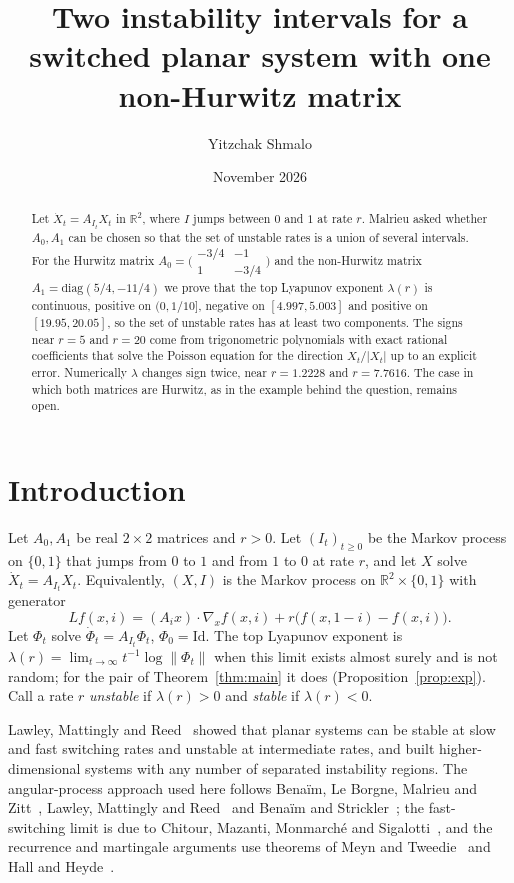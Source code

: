 \documentclass[11pt]{amsart}
\title[Two instability intervals for a switched planar system]{Two instability intervals for a switched planar system with one non-Hurwitz matrix}
\author{Yitzchak Shmalo}
\date{November 2026}
\newcommand{\R}{\mathbb{R}}
\begin{document}
\begin{abstract}
Let $\dot X_t=A_{I_t}X_t$ in $\R^2$, where $I$ jumps between $0$ and $1$ at rate $r$. Malrieu asked whether $A_0,A_1$
can be chosen so that the set of unstable rates is a union of several intervals. For the Hurwitz matrix
$A_0=\bigl(\begin{smallmatrix}-3/4&-1\\1&-3/4\end{smallmatrix}\bigr)$ and the non-Hurwitz matrix $A_1=\mathrm{diag}(5/4,-11/4)$ we prove
that the top Lyapunov exponent $\lambda(r)$ is continuous, positive on $(0,1/10]$, negative on $[4.997,5.003]$ and
positive on $[19.95,20.05]$, so the set of unstable rates has at least two components. The signs near $r=5$ and $r=20$ come from
trigonometric polynomials with exact rational coefficients that solve the Poisson equation for the direction $X_t/|X_t|$
up to an explicit error. Numerically $\lambda$ changes sign twice, near $r=1.2228$ and $r=7.7616$. The case in which both
matrices are Hurwitz, as in the example behind the question, remains open.
\end{abstract}
\maketitle

\section{Introduction}\label{sec:intro}

Let $A_0,A_1$ be real $2\times2$ matrices and $r>0$. Let $(I_t)_{t\ge0}$ be the Markov process on $\{0,1\}$ that jumps
from $0$ to $1$ and from $1$ to $0$ at rate $r$, and let $X$ solve $\dot X_t=A_{I_t}X_t$. Equivalently, $(X,I)$ is the
Markov process on $\R^2\times\{0,1\}$ with generator
\begin{equation}\label{eq:gen}
Lf(x,i)=(A_ix)\cdot\nabla_xf(x,i)+r\bigl(f(x,1-i)-f(x,i)\bigr).
\end{equation}
Let $\Phi_t$ solve $\dot\Phi_t=A_{I_t}\Phi_t$, $\Phi_0=\mathrm{Id}$. The top Lyapunov exponent is
$\lambda(r)=\lim_{t\to\infty}t^{-1}\log\|\Phi_t\|$ when this limit exists almost surely and is not random; for the pair
of Theorem~\ref{thm:main} it does (Proposition~\ref{prop:exp}). Call a rate $r$ \emph{unstable} if $\lambda(r)>0$ and
\emph{stable} if $\lambda(r)<0$.

Lawley, Mattingly and Reed~\cite{LMR14} showed that planar systems can be stable at slow and fast switching rates and
unstable at intermediate rates, and built higher-dimensional systems with any number of separated instability regions.
The angular-process approach used here follows Bena\"im, Le Borgne, Malrieu and Zitt~\cite{BLMZ14}, Lawley, Mattingly
and Reed~\cite{LMR14} and Bena\"im and Strickler~\cite{BS19}; the fast-switching limit is due to Chitour, Mazanti,
Monmarch\'e and Sigalotti~\cite{CMMS23}, and the recurrence and martingale arguments use theorems of Meyn and
Tweedie~\cite{MT09} and Hall and Heyde~\cite{HH80}.
\end{document}
